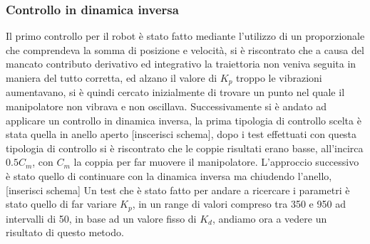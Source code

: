 \subsubsection{Controllo in dinamica inversa}
Il primo controllo per il robot è stato fatto mediante l'utilizzo di un proporzionale che comprendeva la somma di posizione e velocità, si è riscontrato che a causa del mancato contributo derivativo ed integrativo la traiettoria non veniva seguita in maniera del tutto corretta, ed alzano il valore di $K_p$ troppo le vibrazioni aumentavano, si è quindi cercato inizialmente di trovare un punto nel quale il manipolatore non vibrava e non oscillava. Successivamente si è andato ad applicare un controllo in dinamica inversa, la prima tipologia di controllo scelta è stata quella in anello aperto [inscerisci schema], dopo i test effettuati con questa tipologia di controllo si è riscontrato che le coppie risultati erano basse, all'incirca $0.5 C_m$, con $C_m$ la coppia per far muovere il manipolatore. L'approccio successivo è stato quello di continuare con la dinamica inversa ma chiudendo l'anello, [inserisci schema]
Un test che è stato fatto per andare a ricercare i parametri è stato quello di far variare $K_p$, in un range di valori compreso tra 350 e 950 ad intervalli di 50, in base ad un valore fisso di $K_d$, andiamo ora a vedere un risultato di questo metodo.
